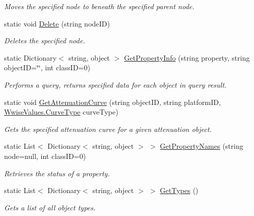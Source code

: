 \begin{DoxyCompactItemize}
\begin{DoxyCompactList}\small\item\em Moves the specified node to beneath the specified parent node. \end{DoxyCompactList}\item 
static void \mbox{\hyperlink{classak_1_1wwise_1_1core_1_1_object_a689cc5e74862db22356b12c10ff3f51d}{Delete}} (string node\+ID)
\begin{DoxyCompactList}\small\item\em Deletes the specified node. \end{DoxyCompactList}\item 
static Dictionary$<$ string, object $>$ \mbox{\hyperlink{classak_1_1wwise_1_1core_1_1_object_a9f2472439a50e49b13338281159180b7}{Get\+Property\+Info}} (string property, string object\+ID=\char`\"{}\char`\"{}, int class\+ID=0)
\begin{DoxyCompactList}\small\item\em Performs a query, returns specified data for each object in query result. \end{DoxyCompactList}\item 
static void \mbox{\hyperlink{classak_1_1wwise_1_1core_1_1_object_a5308de1111e98c53825af0fb6b8384b3}{Get\+Attenuation\+Curve}} (string object\+ID, string platform\+ID, \mbox{\hyperlink{class_waapi_c_s_1_1_custom_values_1_1_wwise_values_a5fa07a83f99814d445c7075a3ebf4850}{Wwise\+Values.\+Curve\+Type}} curve\+Type)
\begin{DoxyCompactList}\small\item\em Gets the specified attenuation curve for a given attenuation object. \end{DoxyCompactList}\item 
static List$<$ Dictionary$<$ string, object $>$ $>$ \mbox{\hyperlink{classak_1_1wwise_1_1core_1_1_object_addb46d88bcefcb12e82a27938ad6e314}{Get\+Property\+Names}} (string node=null, int class\+ID=0)
\begin{DoxyCompactList}\small\item\em Retrieves the status of a property. \end{DoxyCompactList}\item 
static List$<$ Dictionary$<$ string, object $>$ $>$ \mbox{\hyperlink{classak_1_1wwise_1_1core_1_1_object_aeaf3f5194832011baaee49cdb752f5d1}{Get\+Types}} ()
\begin{DoxyCompactList}\small\item\em Gets a list of all object types. \end{DoxyCompactList}\item 

\end{DoxyCompactItemize}
